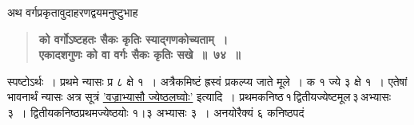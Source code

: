 \documentclass[11pt, openany]{book}
\begin{document}
\begin{sloppypar}
{\small अथ वर्गप्रकृतावुदाहरणद्वयमनुष्टुभाह\textendash }

 \label{6.74}
\begin{quote}
{\large \textbf{{\color{purple}को वर्गोऽष्टहतः सैकः कृतिः स्याद्गणकोच्यताम्~।\\
एकादशगुणः को वा वर्गः सैकः कृतिः सखे~॥~७४~॥}}}
\end{quote}

स्पष्टोऽर्थः~। प्रथमे न्यासः प्र ८ क्षे १~। अत्रैकमिष्टं ह्रस्वं प्रकल्प्य जाते मूले~। क १ ज्ये ३ क्षे १~। एतेषां भावनार्थं न्यासः \; अत्र सूत्रं \hyperref[6.71]{'वज्राभ्यासौ ज्येष्ठलघ्वोः'} इत्यादि~। प्रथमकनिष्ठ\textendash \,१\textendash \,द्वितीयज्येष्टमूल\textendash \,३\textendash \,अभ्यासः ३~। द्वितीयकनिष्ठप्रथमज्येष्ठयोः १।३ अभ्यासः ३~। अनयोरैक्यं ६ कनिष्ठपदं
\end{sloppypar}

\newpage
\end{document}
